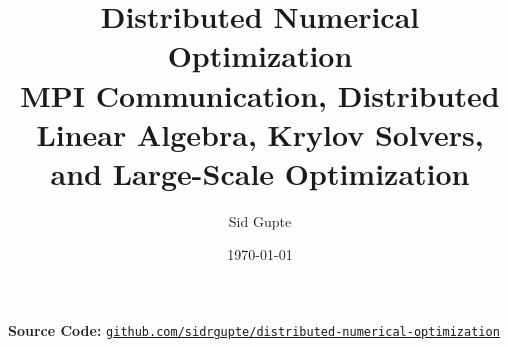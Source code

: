 \documentclass[11pt]{article}
\title{
    \textbf{Distributed Numerical Optimization}\\
    \large MPI Communication, Distributed Linear Algebra,
    Krylov Solvers, and Large-Scale Optimization
}
\author{Sid Gupte}
\date{\today}
\begin{document}
\maketitle

\begin{center}
	\small
	\textbf{Source Code:}
	\href{https://github.com/sidrgupte/distributed-numerical-optimization.git}
	{\texttt{github.com/sidrgupte/distributed-numerical-optimization}}
\end{center}

\tableofcontents
\newpage

% 

\end{document}
